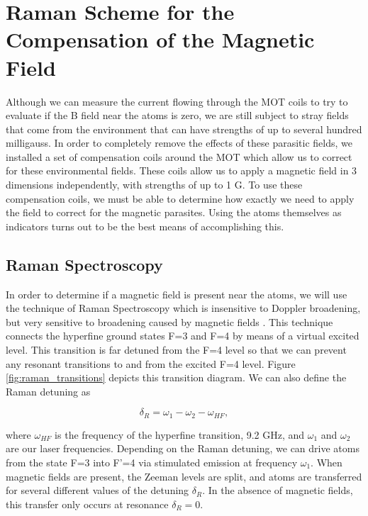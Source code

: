 \section{Raman Scheme for the Compensation of the Magnetic Field}

Although we can measure the current flowing through the MOT coils to try to evaluate if the B field near the atoms is zero, we are still subject to stray fields that come from the environment that can have strengths of up to several hundred milligauss.  In order to completely remove the effects of these parasitic fields, we installed a set of compensation coils around the MOT which allow us to correct for these environmental fields.  These coils allow us to apply a magnetic field in 3 dimensions independently, with strengths of up to 1 G.  To use these compensation coils, we must be able to determine how exactly we need to apply the field to correct for the magnetic parasites.  Using the atoms themselves as indicators turns out to be the best means of accomplishing this.

\subsection{Raman Spectroscopy} 

In order to determine if a magnetic field is present near the atoms, we will
use the technique of Raman Spectroscopy which is insensitive to Doppler broadening, but very sensitive to broadening caused by magnetic fields \cite{ringot2001subrecoil}.  This technique connects the
hyperfine ground states F=3 and F=4 by means of a virtual excited level. This
transition is far detuned from the F=4 level so that we can prevent any
resonant transitions to and from the excited F=4 level.  Figure
\ref{fig:raman_transitions} depicts this transition diagram.  We can also define the Raman detuning as

 
\begin{equation}
  \label{eq:raman}
  \delta_R = \omega_1 - \omega_2 - \omega_{HF},  
\end{equation}


\noindent
where $\omega_{HF}$ is the frequency of the hyperfine transition, 9.2 GHz, and
$\omega_1$ and $\omega_2$ are our laser frequencies.  Depending on the Raman detuning, we can drive atoms from the state F=3 into F'=4 via stimulated emission at frequency $\omega_1$.  When magnetic fields are present, the Zeeman levels are split, and atoms are transferred for several different values of the detuning $\delta_R $.  In the absence of magnetic fields, this transfer only occurs at resonance $\delta_R = 0$. 


